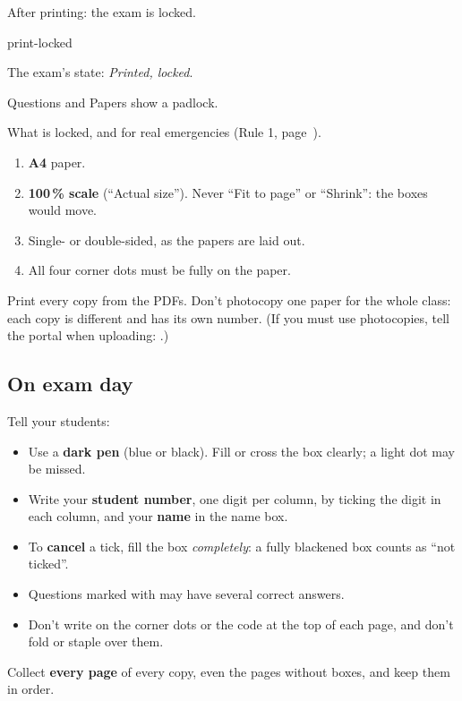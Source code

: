 \documentclass[11pt]{article}
\begin{document}
\begin{keep}
\begin{guidefig}{After printing: the exam is locked.}
\begin{shot}[0.8\linewidth]{print-locked}
\end{shot}
\end{guidefig}
\begin{callouts}
  \item The exam's state: \emph{Printed, locked}.
  \item Questions and Papers show a padlock.
  \item What is locked, and  for real emergencies (Rule 1, page~\pageref{sec:lock}).
\end{callouts}
\end{keep}

\begin{careful}
\begin{enumerate}
  \item \textbf{A4} paper.
  \item \textbf{100\,\% scale} (``Actual size''). Never ``Fit to page'' or ``Shrink'': the boxes would move.
  \item Single- or double-sided, as the papers are laid out.
  \item All four corner dots must be fully on the paper.
\end{enumerate}
Print every copy from the PDFs. Don't photocopy one paper for the whole class: each copy is different and has its own number. (If you must use photocopies, tell the portal when uploading: .)
\end{careful}

\subsection{On exam day}\label{sec:examday}

\begin{panel}[colframe=warn,boxrule=1pt]
Tell your students:
\begin{itemize}
  \item Use a \textbf{dark pen} (blue or black). Fill or cross the box clearly; a light dot may be missed.
  \item Write your \textbf{student number}, one digit per column, by ticking the digit in each column, and your \textbf{name} in the name box.
  \item To \textbf{cancel} a tick, fill the box \emph{completely}: a fully blackened box counts as ``not ticked''.
  \item Questions marked with \raisebox{-1pt}{\textsf{\scriptsize$\clubsuit$}} may have several correct answers.
  \item Don't write on the corner dots or the code at the top of each page, and don't fold or staple over them.
\end{itemize}
Collect \textbf{every page} of every copy, even the pages without boxes, and keep them in order.
\end{panel}
\end{document}
